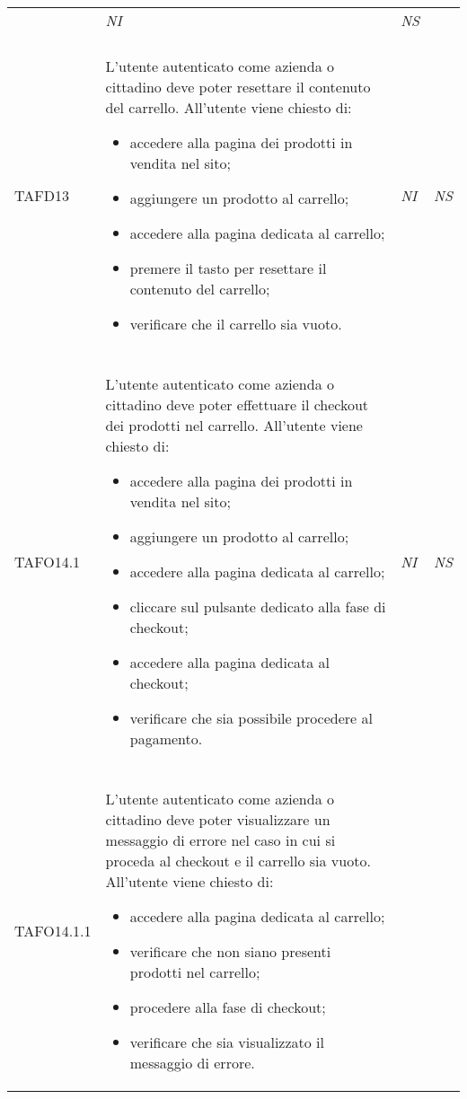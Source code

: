 \begin{longtable}{ >{\centering}p{} >{}p{}
			>{\centering}p{} >{\centering}p{}}
\begin{itemize}
		 \end{itemize} & \textit{NI} & \textit{NS}\\ \tabularnewline
\hypertarget{TAFD13}{TAFD13} & L'utente autenticato come azienda o cittadino deve poter resettare il
		 contenuto del carrello. All'utente viene chiesto di:
		 \begin{itemize}
		 	\item accedere alla pagina dei prodotti in vendita nel sito;
		 	\item aggiungere un prodotto al carrello;
		 	\item accedere alla pagina dedicata al carrello;
		 	\item premere il tasto per resettare il contenuto del carrello;
		 	\item verificare che il carrello sia vuoto.
		 \end{itemize} & \textit{NI} & \textit{NS}\\ \tabularnewline
\hypertarget{TAFO14.1}{TAFO14.1} & L'utente autenticato come azienda o cittadino deve poter effettuare il
		 checkout dei prodotti nel carrello. All'utente viene chiesto di:
		 \begin{itemize}
		 	\item accedere alla pagina dei prodotti in vendita nel sito;
		 	\item aggiungere un prodotto al carrello;
		 	\item accedere alla pagina dedicata al carrello;
		 	\item cliccare sul pulsante dedicato alla fase di checkout;
		 	\item accedere alla pagina dedicata al checkout;
		 	\item verificare che sia possibile procedere al pagamento.
		 \end{itemize} & \textit{NI} & \textit{NS}\\ \tabularnewline
\hypertarget{TAFO14.1.1}{TAFO14.1.1} & L'utente autenticato come azienda o cittadino deve poter visualizzare un
		 messaggio di errore nel caso in cui si proceda al checkout e il carrello sia
		 vuoto. All'utente viene chiesto di:
		 \begin{itemize}
		 	\item accedere alla pagina dedicata al carrello;
		 	\item verificare che non siano presenti prodotti nel carrello;
		 	\item procedere alla fase di checkout;
		 	\item verificare che sia visualizzato il messaggio di errore.

\end{itemize}
\end{longtable}
